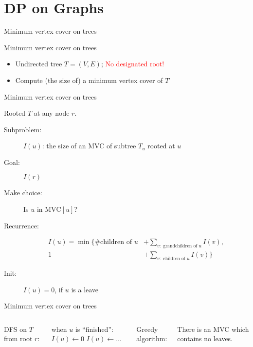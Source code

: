 \section{DP on Graphs}

\begin{frame}{Minimum vertex cover on trees}
  \begin{exampleblock}{Minimum vertex cover on trees }
    \begin{itemize}
	  \item Undirected tree $T = (V, E)$; \textcolor{red}{No designated root!}
      \item Compute (the size of) a minimum vertex cover of $T$
    \end{itemize}
  \end{exampleblock}

\end{frame}
\begin{frame}{Minimum vertex cover on trees}
  \centerline{Rooted $T$ at any node $r$.}
  \pause
  \vspace{0.30cm}

  \begin{description}
	\item[Subproblem:] $I(u)$: the size of an MVC of subtree $T_{u}$ rooted at $u$
	\item[Goal:] $I(r)$
	  \pause
	\item[Make choice:] Is $u$ in $\text{MVC}[u]$?
	\item[Recurrence:] 
	  \begin{align*}
		I(u) = \min \{\text{\# children of } u &+ \sum_{v: \text{ grandchildren of } u} I(v), \\
			1 &+ \sum_{v: \text{ children of } u} I(v)\}
	  \end{align*}
	  \pause
	\item[Init:] $I(u) = 0$, if $u$ is a leave
  \end{description}
\end{frame}
\begin{frame}{Minimum vertex cover on trees}
  \begin{columns}
	  DFS on $T$ from root $r$:

	  \vspace{0.50cm}
	  \begin{algorithmic}
		\State when $u$ is ``finished'':
		  \State $I(u) \gets 0$
		\Else
		  \State $I(u) \gets \dots$ 
		\EndIf
	  \end{algorithmic}
	  \pause
	  Greedy algorithm:

	  \vspace{0.50cm}
	  \begin{theorem}
		There is an MVC which contains no leaves.
	  \end{theorem}
  \end{columns}
\end{frame}
